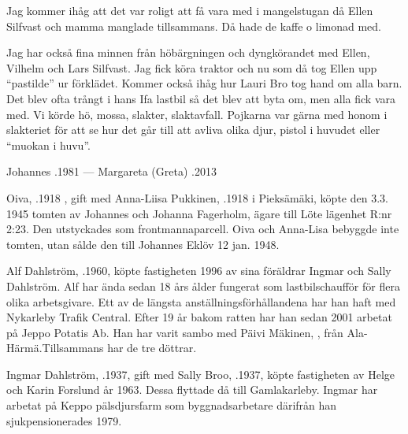 Jag kommer ihåg att det var roligt att få vara med i mangelstugan då Ellen Silfvast och mamma manglade tillsammans. Då hade de kaffe o limonad med.

Jag har också fina minnen från höbärgningen och dyngkörandet med Ellen, Vilhelm och Lars Silfvast. Jag fick köra traktor och nu som då tog Ellen upp ``pastilde'' ur förklädet. Kommer också ihåg hur Lauri Bro tog hand om alla barn. Det blev ofta trångt i hans Ifa lastbil så det blev att byta om, men alla fick vara med. Vi körde hö, mossa, slakter, slaktavfall. Pojkarna var gärna med honom i slakteriet för att se hur det går till att avliva olika djur, pistol i huvudet eller ``muokan i huvu''.

Johannes .1981  ---  Margareta (Greta) .2013


Oiva, .1918 , gift med Anna-Liisa Pukkinen, .1918 i Pieksämäki, köpte den 3.3. 1945 tomten av Johannes och Johanna Fagerholm, ägare till Löte lägenhet R:nr 2:23. Den utstyckades som frontmannaparcell. Oiva och Anna-Lisa bebyggde inte tomten, utan sålde den till Johannes Eklöv 12 jan. 1948.






Alf Dahlström, .1960, köpte fastigheten 1996 av sina föräldrar Ingmar och Sally Dahlström. Alf har ända sedan 18 års ålder fungerat som lastbilschaufför för flera olika arbetsgivare. Ett av de längsta anställningsförhållandena har han haft med Nykarleby Trafik Central. Efter 19 år bakom ratten har han sedan 2001 arbetat på Jeppo Potatis Ab. Han har varit sambo med Päivi Mäkinen, , från Ala-Härmä.Tillsammans har de tre döttrar.
\begin{jhchildren}
  \item {}
  \item {}
  \item {}
\end{jhchildren}


Ingmar Dahlström, .1937, gift med Sally Broo, .1937, köpte fastigheten av Helge och Karin Forslund år 1963. Dessa flyttade då till Gamlakarleby. Ingmar har arbetat  på Keppo pälsdjursfarm som byggnadsarbetare därifrån han sjukpensionerades 1979.

